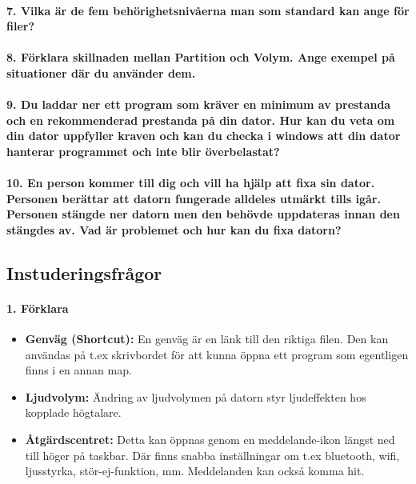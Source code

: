 \paragraph{7. Vilka är de fem behörighetsnivåerna man som standard kan ange för filer?}

\paragraph{8. Förklara skillnaden mellan Partition och Volym. Ange exempel på situationer där du använder dem.}

\paragraph{9. Du laddar ner ett program som kräver en minimum av prestanda och en rekommenderad prestanda på din dator. Hur kan du veta om din dator uppfyller kraven och kan du checka i windows att din dator hanterar programmet och inte blir överbelastat?}

\paragraph{10. En person kommer till dig och vill ha hjälp att fixa sin dator. Personen berättar att datorn fungerade alldeles utmärkt tills igår. Personen stängde ner datorn men den behövde uppdateras innan den stängdes av. Vad är problemet och hur kan du fixa datorn?}

\newpage
\subsection{Instuderingsfrågor}

\paragraph{1. Förklara}
\begin{itemize}
	\item \textbf{Genväg (Shortcut):} En genväg är en länk till den riktiga filen. Den kan användas på t.ex skrivbordet för att kunna öppna ett program som egentligen finns i en annan map.
	\item \textbf{Ljudvolym:} Ändring av ljudvolymen på datorn styr ljudeffekten hos kopplade högtalare.
	\item \textbf{Åtgärdscentret:} Detta kan öppnas genom en meddelande-ikon längst ned till höger på taskbar. Där finns snabba inställningar om t.ex bluetooth, wifi, ljusstyrka, stör-ej-funktion, mm. Meddelanden kan också komma hit.
\end{itemize}

